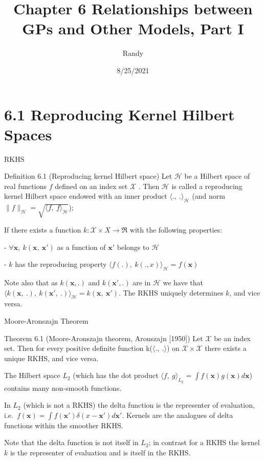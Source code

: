 \documentclass[
  ignorenonframetext,
]{beamer}
\title{Chapter 6 Relationships between GPs and Other Models, Part I}
\author{Randy}
\date{8/25/2021}
\begin{document}
\frame{\titlepage}

\begin{frame}[allowframebreaks]
  \tableofcontents[hideallsubsections]
\end{frame}
\hypertarget{reproducing-kernel-hilbert-spaces}{%
\section{6.1 Reproducing Kernel Hilbert
Spaces}\label{reproducing-kernel-hilbert-spaces}}

\begin{frame}{RKHS}
\protect\hypertarget{rkhs}{}
\begin{block} {Definition 6.1 (Reproducing kernel Hilbert space)} 
Let $\mathcal H$ be a Hilbert space of real functions $f$ defined on an index set $\mathcal X$ . Then $\mathcal H$ is called a reproducing kernel Hilbert space endowed with an inner product $\langle .,\ .\rangle_{\mathcal H}$ (and norm $\|f\|_{\mathcal H} = \sqrt{\langle f,\ f\rangle_{\mathcal H}}$);

If there exists a function $k: \mathcal X \times X \rightarrow \mathfrak R$ with the following properties:

- $\forall \pmb x,\ k(\pmb x,\ \pmb x')$ as a function of $\pmb x'$ belongs to $\mathcal H$

- $k$ has the reproducing property $\langle f(.),\ k(., x)\rangle _{\mathcal H} = f(\pmb x)$

\end{block}

Note also that as \(k(\pmb x, .)\) and \(k(\pmb x', .)\) are in
\(\mathcal H\) we have that
\(\langle k(\pmb x,\ .),\ k(\pmb x',\ .)\rangle_{\mathcal H}= k(\pmb x,\ \pmb x')\).
The RKHS uniquely determines \(k\), and vice versa.
\end{frame}

\begin{frame}{Moore-Aronszajn Theorem}
\protect\hypertarget{moore-aronszajn-theorem}{}
\begin{alertblock}{Theorem 6.1 (Moore-Aronszajn theorem, Aronszajn [1950])}
Let $\mathcal X$ be an index set. Then for every positive definite function k($\langle .,\ .\rangle$) on $\mathcal X \times \mathcal X$ there exists a unique RKHS, and vice versa.
\end{alertblock}

The Hilbert space \(L_2\) (which has the dot product
\(\langle f,\ g\rangle_{L_2} = \int f(\pmb x)g(\pmb x)d\pmb x\))
contains many non-smooth functions.

In \(L_2\) (which is not a RKHS) the delta function is the representer
of evaluation,
i.e.~\(f(\pmb x) = \int f( \pmb x') \delta (x− \pmb x')d \pmb x'\).
Kernels are the analogues of delta functions within the smoother RKHS.

Note that the delta function is not itself in \(L_2\); in contrast for a
RKHS the kernel \(k\) is the representer of evaluation and is itself in
the RKHS.
\end{frame}
\end{document}
